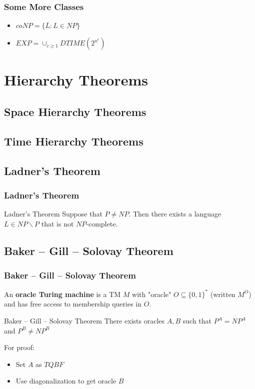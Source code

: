 \documentclass{beamer}
\begin{document}
\begin{frame}

\frametitle{Some More Classes}

\begin{itemize}
\item $coNP = \{\overline{L}: L \in NP\}$
\item $EXP = \cup_{c \geq 1} DTIME(2^{n^c})$
\end{itemize}

\end{frame}



\section{Hierarchy Theorems}

\subsection{Space Hierarchy Theorems}

\subsection{Time Hierarchy Theorems}

\subsection{Ladner's Theorem}

\begin{frame}
\frametitle{Ladner's Theorem}

\begin{block}{Ladner's Theorem}
Suppose that $P \neq NP$. Then there exists a language $L \in NP \backslash P$ that is not $NP$-complete.
\end{block}

\end{frame}

\subsection{Baker -- Gill -- Solovay Theorem}

\begin{frame}
\frametitle{Baker -- Gill -- Solovay Theorem}

An \textbf{oracle Turing machine} is a TM $M$ with "oracle" $O \subseteq \{0,1\}^*$ (written $M^O$) and has free access to membership queries in $O$.

\begin{block}{Baker -- Gill -- Solovay Theorem}
There exists oracles $A, B$ such that $P^A = NP^A$ and $P^B \neq NP^B$
\end{block}

For proof:

\begin{itemize}
\item Set $A$ as $TQBF$
\item Use diagonalization to get oracle $B$
\end{itemize}

\end{frame}
\end{document}
